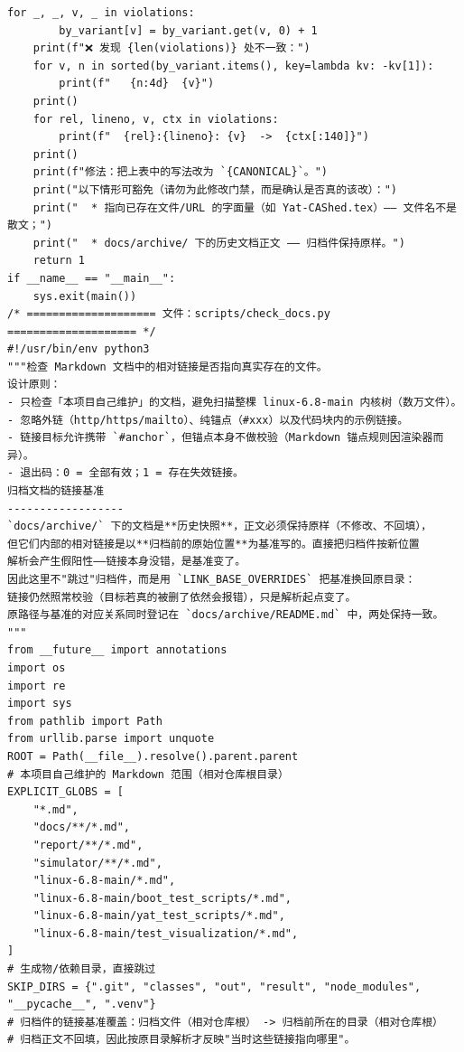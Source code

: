 \documentclass[10pt,a4paper]{article}
\newenvironment{yatpage}{\vspace*{0pt}}{\par}
\begin{document}
\begin{yatpage}
\begin{Verbatim}[fontsize=\fontsize{8.2}{9.8}\selectfont]
    for _, _, v, _ in violations:
        by_variant[v] = by_variant.get(v, 0) + 1
    print(f"❌ 发现 {len(violations)} 处不一致：")
    for v, n in sorted(by_variant.items(), key=lambda kv: -kv[1]):
        print(f"   {n:4d}  {v}")
    print()
    for rel, lineno, v, ctx in violations:
        print(f"  {rel}:{lineno}: {v}  ->  {ctx[:140]}")
    print()
    print(f"修法：把上表中的写法改为 `{CANONICAL}`。")
    print("以下情形可豁免（请勿为此修改门禁，而是确认是否真的该改）：")
    print("  * 指向已存在文件/URL 的字面量（如 Yat-CAShed.tex）—— 文件名不是散文；")
    print("  * docs/archive/ 下的历史文档正文 —— 归档件保持原样。")
    return 1
if __name__ == "__main__":
    sys.exit(main())
/* ==================== 文件：scripts/check_docs.py ==================== */
#!/usr/bin/env python3
"""检查 Markdown 文档中的相对链接是否指向真实存在的文件。
设计原则：
- 只检查「本项目自己维护」的文档，避免扫描整棵 linux-6.8-main 内核树（数万文件）。
- 忽略外链（http/https/mailto）、纯锚点（#xxx）以及代码块内的示例链接。
- 链接目标允许携带 `#anchor`，但锚点本身不做校验（Markdown 锚点规则因渲染器而异）。
- 退出码：0 = 全部有效；1 = 存在失效链接。
归档文档的链接基准
------------------
`docs/archive/` 下的文档是**历史快照**，正文必须保持原样（不修改、不回填），
但它们内部的相对链接是以**归档前的原始位置**为基准写的。直接把归档件按新位置
解析会产生假阳性——链接本身没错，是基准变了。
因此这里不"跳过"归档件，而是用 `LINK_BASE_OVERRIDES` 把基准换回原目录：
链接仍然照常校验（目标若真的被删了依然会报错），只是解析起点变了。
原路径与基准的对应关系同时登记在 `docs/archive/README.md` 中，两处保持一致。
"""
from __future__ import annotations
import os
import re
import sys
from pathlib import Path
from urllib.parse import unquote
ROOT = Path(__file__).resolve().parent.parent
# 本项目自己维护的 Markdown 范围（相对仓库根目录）
EXPLICIT_GLOBS = [
    "*.md",
    "docs/**/*.md",
    "report/**/*.md",
    "simulator/**/*.md",
    "linux-6.8-main/*.md",
    "linux-6.8-main/boot_test_scripts/*.md",
    "linux-6.8-main/yat_test_scripts/*.md",
    "linux-6.8-main/test_visualization/*.md",
]
# 生成物/依赖目录，直接跳过
SKIP_DIRS = {".git", "classes", "out", "result", "node_modules", "__pycache__", ".venv"}
# 归档件的链接基准覆盖：归档文件（相对仓库根） -> 归档前所在的目录（相对仓库根）
# 归档正文不回填，因此按原目录解析才反映"当时这些链接指向哪里"。
\end{Verbatim}
\end{yatpage}
\end{document}
